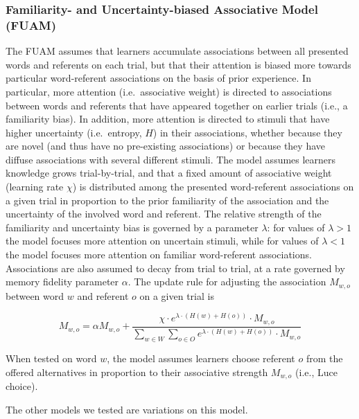 \documentclass[10pt, letterpaper]{article}
\begin{document}
\subsubsection{Familiarity- and Uncertainty-biased Associative Model
(FUAM)}\label{familiarity--and-uncertainty-biased-associative-model-fuam}

The FUAM assumes that learners accumulate associations between all
presented words and referents on each trial, but that their attention is
biased more towards particular word-referent associations on the basis
of prior experience. In particular, more attention (i.e.~associative
weight) is directed to associations between words and referents that
have appeared together on earlier trials (i.e., a familiarity bias). In
addition, more attention is directed to stimuli that have higher
uncertainty (i.e.~entropy, \(H\)) in their associations, whether because
they are novel (and thus have no pre-existing associations) or because
they have diffuse associations with several different stimuli. The model
assumes learners knowledge grows trial-by-trial, and that a fixed amount
of associative weight (learning rate \(\chi\)) is distributed among the
presented word-referent associations on a given trial in proportion to
the prior familiarity of the association and the uncertainty of the
involved word and referent. The relative strength of the familiarity and
uncertainty bias is governed by a parameter \(\lambda\): for values of
\(\lambda>1\) the model focuses more attention on uncertain stimuli,
while for values of \(\lambda<1\) the model focuses more attention on
familiar word-referent associations. Associations are also assumed to
decay from trial to trial, at a rate governed by memory fidelity
parameter \(\alpha\). The update rule for adjusting the association
\(M_{w,o}\) between word \(w\) and referent \(o\) on a given trial is

\begin{equation}
M_{w,o} =  \alpha M_{w,o} + \frac{ \chi \cdot e^{ \lambda \cdot (H(w) + H(o)) } \cdot M_{w,o}  }{  \sum_{w\in W} \sum_{o\in O} e^{ \lambda \cdot (H(w) + H(o)) } \cdot M_{w,o} }
\label{eq:fullmodel}
\end{equation}

When tested on word \(w\), the model assumes learners choose referent
\(o\) from the offered alternatives in proportion to their associative
strength \(M_{w,o}\) (i.e., Luce choice).

The other models we tested are variations on this model.
\end{document}
